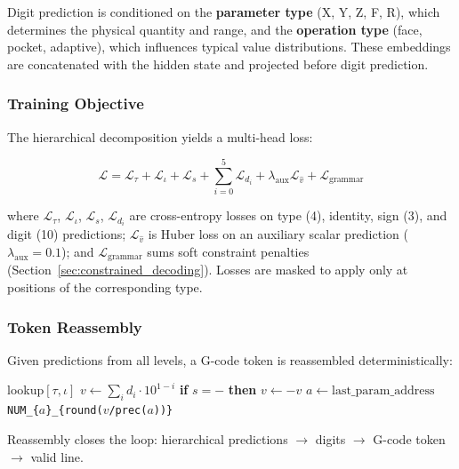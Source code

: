 \documentclass[sensors,article,submit,moreauthors,pdftex]{Definitions/mdpi}
\begin{document}
Digit prediction is conditioned on the \textbf{parameter type} (X, Y, Z, F, R), which determines the physical quantity and range, and the \textbf{operation type} (face, pocket, adaptive), which influences typical value distributions. These embeddings are concatenated with the hidden state and projected before digit prediction.

\subsubsection{Training Objective}

The hierarchical decomposition yields a multi-head loss:

\begin{equation}
\mathcal{L} = \mathcal{L}_\tau + \mathcal{L}_\iota + \mathcal{L}_s + \sum_{i=0}^{5} \mathcal{L}_{d_i} + \lambda_{\text{aux}} \mathcal{L}_{\hat{v}} + \mathcal{L}_{\text{grammar}}
\label{eq:loss}
\end{equation}

where $\mathcal{L}_\tau$, $\mathcal{L}_\iota$, $\mathcal{L}_s$, $\mathcal{L}_{d_i}$ are cross-entropy losses on type (4), identity, sign (3), and digit (10) predictions; $\mathcal{L}_{\hat{v}}$ is Huber loss on an auxiliary scalar prediction ($\lambda_{\text{aux}} = 0.1$); and $\mathcal{L}_{\text{grammar}}$ sums soft constraint penalties (Section~\ref{sec:constrained_decoding}). Losses are masked to apply only at positions of the corresponding type.

\subsubsection{Token Reassembly}

Given predictions from all levels, a G-code token is reassembled deterministically:

\begin{algorithmic}[1]
\small
{}
        \State \Return lookup$[\tau, \iota]$  
        \State $v \gets \sum_i d_i \cdot 10^{1-i}$  
        \State \textbf{if} $s = -$ \textbf{then} $v \gets -v$
        \State $a \gets \text{last\_param\_address}$
        \State \Return \texttt{NUM\_\{$a$\}\_\{round($v$/prec($a$))\}}
    \EndIf
\EndFunction
\end{algorithmic}

\smallskip\noindent Reassembly closes the loop: hierarchical predictions $\to$ digits $\to$ G-code token $\to$ valid line.
\end{document}
